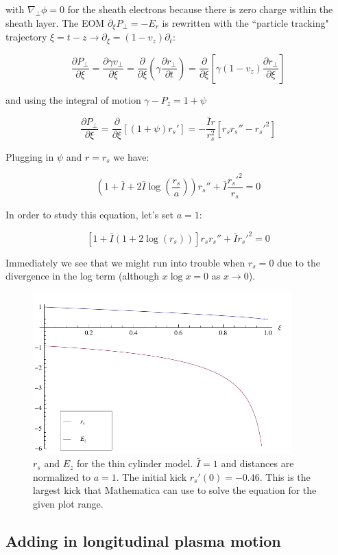 \documentclass[aps,prl,preprint,groupedaddress]{revtex4-1}
\begin{document}
with $\nabla_{\perp} \phi = 0$ for the sheath electrons because there is zero charge within the sheath layer. The EOM $\partial_{\xi} P_{\perp} = -E_r$ is rewritten with the ``particle tracking" trajectory $\xi = t - z \rightarrow \partial_{\xi} = (1-v_z)\partial_t$:

\begin{equation}\label{eq:track}
\frac{\partial P_{\perp}}{\partial \xi} = \frac{\partial \gamma v_{\perp}}{\partial \xi} =  \frac{\partial}{\partial \xi}\left(\gamma \frac{\partial r_{\perp}}{\partial t}\right) = \frac{\partial}{\partial \xi}\left[\gamma (1-v_z)\frac{\partial r_{\perp}}{\partial \xi}\right]
\end{equation}

and using the integral of motion $\gamma - P_z = 1 + \psi$

\begin{equation}\label{eq:EOM}
\frac{\partial P_{\perp}}{\partial \xi} = \frac{\partial}{\partial \xi}[(1+\psi)r_s'] = -\frac{\bar{I} r}{r_s^2}[r_s r_s'' - r_s'^2] 
\end{equation}

Plugging in $\psi$ and $r=r_s$ we have:

\begin{equation}\label{eq:rs}
\left(1+\bar{I} + 2\bar{I}\log\left(\frac{r_s}{a}\right) \right)r_s'' +\bar{I}\frac{r_s'^2}{r_s} = 0
\end{equation}

In order to study this equation, let's set $a=1$:

\begin{equation}\label{eq:rs_simp}
[1+\bar{I}(1+2\log(r_s))] r_s r_s'' + \bar{I}r_s'^2 = 0
\end{equation}

Immediately we see that we might run into trouble when $r_s = 0$ due to the divergence in the log term (although $x\log x = 0$ as $x\rightarrow0$).

\begin{figure}[ht]\label{fig:sheath}
  \centering
    \includegraphics[width=100mm]{./figures/sheath.pdf}
      \caption{$r_s$ and $E_z$ for the thin cylinder model. $\bar{I} = 1$ and distances are normalized to $a=1$. The initial kick $r_s'(0) = -0.46$. This is the largest kick that Mathematica can use to solve the equation for the given plot range.}
\end{figure}

\subsection{Adding in longitudinal plasma motion}
\end{document}
